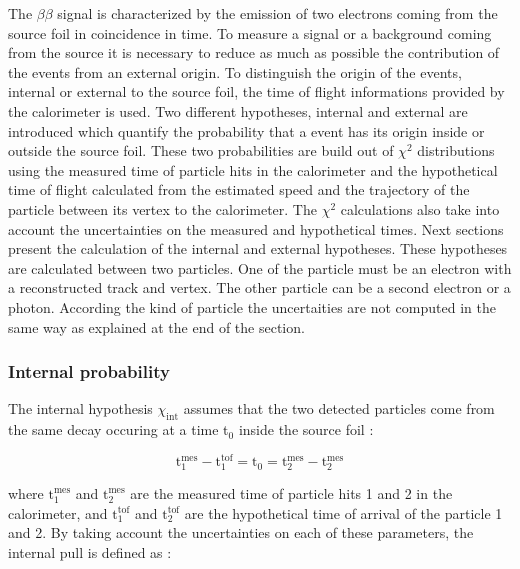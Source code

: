 \documentclass[main.tex]{subfiles}
\begin{document}
\NI The $\beta\beta$ signal is characterized by the emission of two electrons coming from the source foil in coincidence in time. To measure a signal or a background coming from the source it is necessary to reduce as much as possible the contribution of the events from an external origin. To distinguish the origin of the events, internal or external to the source foil, the time of flight informations provided by the calorimeter is used. Two different hypotheses, internal and external are introduced which quantify the probability that a event has its origin inside or outside the source foil. These two probabilities are build out of $\chi^\text{2}$ distributions using the measured time of particle hits in the calorimeter and the hypothetical time of flight calculated from the estimated speed and the trajectory of the particle between its vertex to the calorimeter. The $\chi^\text{2}$ calculations also take into account the uncertainties on the measured and hypothetical times. Next sections present the calculation of the internal and external hypotheses. These hypotheses are calculated between two particles. One of the particle must be an electron with a reconstructed track and vertex.  The other particle can be a second electron or a photon. According the kind of particle the uncertaities are not computed in the same way as explained at the end of the section.


\subsubsection{Internal probability}\label{sec:Pint}


\NI The internal hypothesis $\chi_{\text{int}}$ assumes that the two detected particles come from the same decay occuring at a time t$_\text{0}$ inside the source foil :


\begin{equation}
\text{t}_\text{1}^{\text{mes}} - \text{t}_\text{1}^{\text{tof}} = \text{t}_\text{0} = \text{t}_\text{2}^{\text{mes}} - \text{t}_\text{2}^{\text{mes}}  
\end{equation}


\NI where $\text{t}_\text{1}^{\text{mes}}$ and $\text{t}_\text{2}^{\text{mes}}$ are the measured time of particle hits 1 and 2 in the calorimeter, and $\text{t}_\text{1}^{\text{tof}}$ and $\text{t}_\text{2}^{\text{tof}}$ are the hypothetical time of arrival of the particle 1 and 2. By taking account the uncertainties on each of these parameters, the internal pull is defined as :
\end{document}
